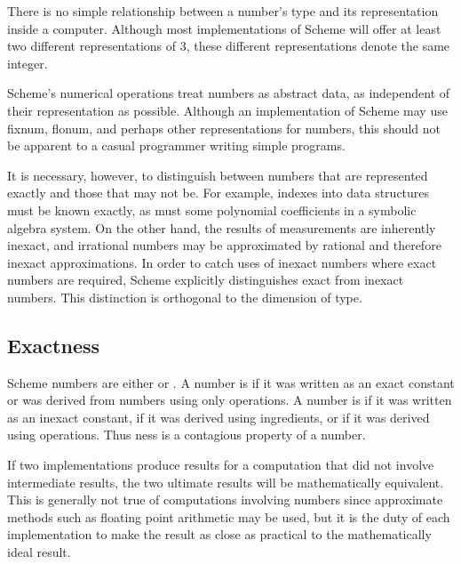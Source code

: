 There is no simple relationship between a number's type and its
representation inside a computer.  Although most implementations of
Scheme will offer at least two different representations of 3, these
different representations denote the same integer.


Scheme's numerical operations treat numbers as abstract data, as
independent of their representation as possible.  Although an implementation
of Scheme may use fixnum, flonum, and perhaps other representations for
numbers, this should not be apparent to a casual programmer writing
simple programs.

It is necessary, however, to distinguish between numbers that are
represented exactly and those that may not be.  For example, indexes
into data structures must be known exactly, as must some polynomial
coefficients in a symbolic algebra system.  On the other hand, the
results of measurements are inherently inexact, and irrational numbers
may be approximated by rational and therefore inexact approximations.
In order to catch uses of inexact numbers where exact numbers are
required, Scheme explicitly distinguishes exact from inexact numbers.
This distinction is orthogonal to the dimension of type.

\subsection{Exactness}


 \label{exactly}
Scheme numbers are either  or .  A number is
 if it was written as an exact constant or was derived from
 numbers using only  operations.  A number is
 if it was written as an inexact constant,
if it was
derived using  ingredients, or if it was derived using
 operations. Thus ness is a contagious
property of a number.

\vest If two implementations produce  results for a
computation that did not involve  intermediate results,
the two ultimate results will be mathematically equivalent.  This is
generally not true of computations involving  numbers
since approximate methods such as floating point arithmetic may be used,
but it is the duty of each implementation to make the result as close as
practical to the mathematically ideal result.

